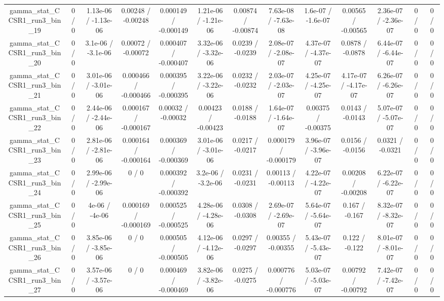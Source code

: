 \documentclass[10pt]{article}
\begin{document}
\begin{table}[htbp]
\begin{center}
\begin{tabular}{|c|c|c|c|c|c|c|c|c|c|c|c|c|}
  gamma_stat_CCSR1_run3_bin_19 & 0 / 0 & 1.13e-06 / -1.13e-06 & 0.00248 / -0.00248 & 0.000149 / -0.000149 & 1.21e-06 / -1.21e-06 & 0.00874 / -0.00874 & 7.63e-08 / -7.63e-08 & 1.6e-07 / -1.6e-07 & 0.00565 / -0.00565 & 2.36e-07 / -2.36e-07 & 0 / 0 & 0 / 0 \\ 
  gamma_stat_CCSR1_run3_bin_20 & 0 / 0 & 3.1e-06 / -3.1e-06 & 0.00072 / -0.00072 & 0.000407 / -0.000407 & 3.32e-06 / -3.32e-06 & 0.0239 / -0.0239 & 2.08e-07 / -2.08e-07 & 4.37e-07 / -4.37e-07 & 0.0878 / -0.0878 & 6.44e-07 / -6.44e-07 & 0 / 0 & 0 / 0 \\ 
  gamma_stat_CCSR1_run3_bin_21 & 0 / 0 & 3.01e-06 / -3.01e-06 & 0.000466 / -0.000466 & 0.000395 / -0.000395 & 3.22e-06 / -3.22e-06 & 0.0232 / -0.0232 & 2.03e-07 / -2.03e-07 & 4.25e-07 / -4.25e-07 & 4.17e-07 / -4.17e-07 & 6.26e-07 / -6.26e-07 & 0 / 0 & 0 / 0 \\ 
  gamma_stat_CCSR1_run3_bin_22 & 0 / 0 & 2.44e-06 / -2.44e-06 & 0.000167 / -0.000167 & 0.00032 / -0.00032 & 0.00423 / -0.00423 & 0.0188 / -0.0188 & 1.64e-07 / -1.64e-07 & 0.00375 / -0.00375 & 0.0143 / -0.0143 & 5.07e-07 / -5.07e-07 & 0 / 0 & 0 / 0 \\ 
  gamma_stat_CCSR1_run3_bin_23 & 0 / 0 & 2.81e-06 / -2.81e-06 & 0.000164 / -0.000164 & 0.000369 / -0.000369 & 3.01e-06 / -3.01e-06 & 0.0217 / -0.0217 & 0.000179 / -0.000179 & 3.96e-07 / -3.96e-07 & 0.0156 / -0.0156 & 0.0321 / -0.0321 & 0 / 0 & 0 / 0 \\ 
  gamma_stat_CCSR1_run3_bin_24 & 0 / 0 & 2.99e-06 / -2.99e-06 & 0 / 0 & 0.000392 / -0.000392 & 3.2e-06 / -3.2e-06 & 0.0231 / -0.0231 & 0.00113 / -0.00113 & 4.22e-07 / -4.22e-07 & 0.00208 / -0.00208 & 6.22e-07 / -6.22e-07 & 0 / 0 & 0 / 0 \\ 
  gamma_stat_CCSR1_run3_bin_25 & 0 / 0 & 4e-06 / -4e-06 & 0.000169 / -0.000169 & 0.000525 / -0.000525 & 4.28e-06 / -4.28e-06 & 0.0308 / -0.0308 & 2.69e-07 / -2.69e-07 & 5.64e-07 / -5.64e-07 & 0.167 / -0.167 & 8.32e-07 / -8.32e-07 & 0 / 0 & 0 / 0 \\ 
  gamma_stat_CCSR1_run3_bin_26 & 0 / 0 & 3.85e-06 / -3.85e-06 & 0 / 0 & 0.000505 / -0.000505 & 4.12e-06 / -4.12e-06 & 0.0297 / -0.0297 & 0.00355 / -0.00355 & 5.43e-07 / -5.43e-07 & 0.122 / -0.122 & 8.01e-07 / -8.01e-07 & 0 / 0 & 0 / 0 \\ 
  gamma_stat_CCSR1_run3_bin_27 & 0 / 0 & 3.57e-06 / -3.57e-06 & 0 / 0 & 0.000469 / -0.000469 & 3.82e-06 / -3.82e-06 & 0.0275 / -0.0275 & 0.000776 / -0.000776 & 5.03e-07 / -5.03e-07 & 0.00792 / -0.00792 & 7.42e-07 / -7.42e-07 & 0 / 0 & 0 / 0 \\ 

\end{tabular}
\end{center}
\end{table}
\end{document}

